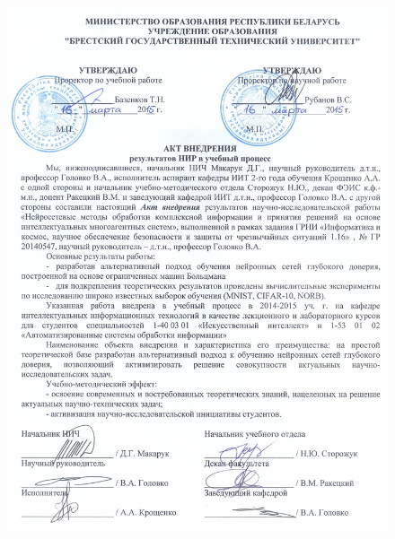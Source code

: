 \begin{figure}[ht]
	\centering
	\includegraphics[height=23cm]{man-source/images/appendix/appendixActs/act_BSTU.jpg}
\end{figure}

